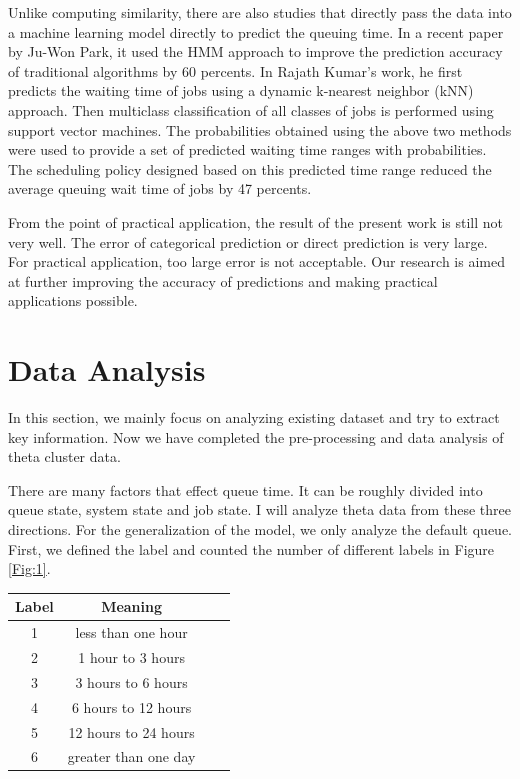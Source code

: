 \documentclass[conference,compsoc]{IEEEtran}
\begin{document}
Unlike computing similarity, there are also studies that directly pass the data into a machine learning model directly to predict the queuing time. In a recent paper by Ju-Won Park\cite{park2022queue}, it used the HMM approach to improve the prediction accuracy of traditional algorithms by 60 percents. In Rajath Kumar's\cite{kumar2014prediction} work, he first predicts the waiting time of jobs using a dynamic k-nearest neighbor (kNN) approach. Then multiclass classification of all classes of jobs is performed using support vector machines. The probabilities obtained using the above two methods were used to provide a set of predicted waiting time ranges with probabilities. The scheduling policy designed based on this predicted time range reduced the average queuing wait time of jobs by 47 percents.

From the point of practical application, the result of the present work is still not very well. The error of categorical prediction or direct prediction is very large. For practical application, too large error is not acceptable. Our research is aimed at further improving the accuracy of predictions and making practical applications possible.

\section{Data Analysis}
In this section, we mainly focus on analyzing existing dataset and try to extract key information. Now we have completed the pre-processing and data analysis of theta cluster data.

There are many factors that effect queue time. It can be roughly divided into queue state, system state and job state. I will analyze theta data from these three directions. For the generalization of the model, we only analyze the default queue.
First, we defined the label and counted the number of different labels in Figure \ref{Fig:1}.

\begin{center}
	\begin{tabular}{||c|c|c|c||} 
		\hline
		Label & Meaning  \\ [0.5ex] 
		\hline\hline
		1 & less than one hour  \\ 
		\hline
		2 & 1 hour to 3 hours   \\
		\hline
		3 & 3 hours to 6 hours   \\
		\hline
		4 & 6 hours to 12 hours \\
		\hline
		5 & 12 hours to 24 hours   \\
		\hline
		6 & greater than one day  \\ 
		\hline
	\end{tabular}
	\label{table:1}
\end{center}
\end{document}
